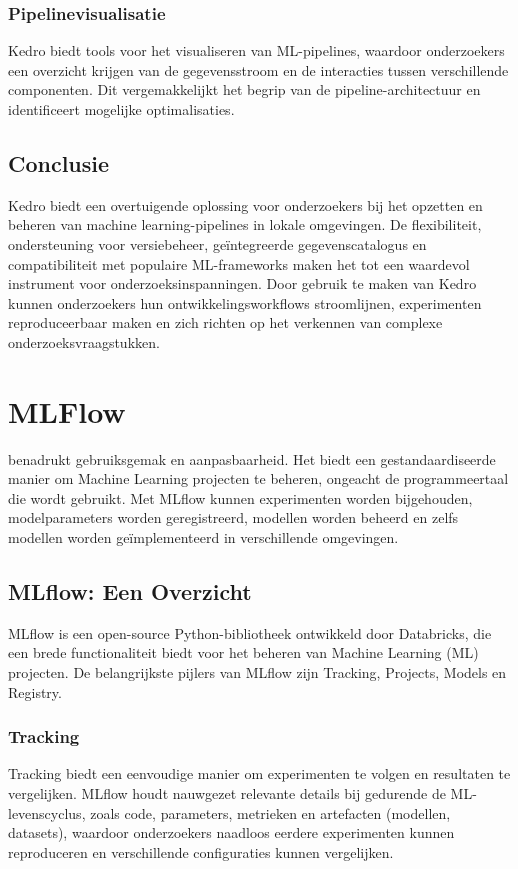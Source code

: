 \subsubsection{Pipelinevisualisatie}
Kedro biedt tools voor het visualiseren van ML-pipelines, waardoor onderzoekers een overzicht krijgen van de gegevensstroom en de interacties tussen verschillende componenten. Dit vergemakkelijkt het begrip van de pipeline-architectuur en identificeert mogelijke optimalisaties.

\subsection{Conclusie}

Kedro biedt een overtuigende oplossing voor onderzoekers bij het opzetten en beheren van machine learning-pipelines in lokale omgevingen. De flexibiliteit, ondersteuning voor versiebeheer, geïntegreerde gegevenscatalogus en compatibiliteit met populaire ML-frameworks maken het tot een waardevol instrument voor onderzoeksinspanningen. Door gebruik te maken van Kedro kunnen onderzoekers hun ontwikkelingsworkflows stroomlijnen, experimenten reproduceerbaar maken en zich richten op het verkennen van complexe onderzoeksvraagstukken.
\section{MLFlow}

\textcite{MLflow2023} benadrukt gebruiksgemak en aanpasbaarheid. Het biedt een gestandaardiseerde manier om Machine Learning projecten te beheren, ongeacht de programmeertaal die wordt gebruikt. Met MLflow kunnen experimenten worden bijgehouden, modelparameters worden geregistreerd, modellen worden beheerd en zelfs modellen worden geïmplementeerd in verschillende omgevingen.

\subsection{MLflow: Een Overzicht}

MLflow is een open-source Python-bibliotheek ontwikkeld door Databricks, die een brede functionaliteit biedt voor het beheren van Machine Learning (ML) projecten. De belangrijkste pijlers van MLflow zijn Tracking, Projects, Models en Registry.

\subsubsection{Tracking}
Tracking biedt een eenvoudige manier om experimenten te volgen en resultaten te vergelijken. MLflow houdt nauwgezet relevante details bij gedurende de ML-levenscyclus, zoals code, parameters, metrieken en artefacten (modellen, datasets), waardoor onderzoekers naadloos eerdere experimenten kunnen reproduceren en verschillende configuraties kunnen vergelijken.

